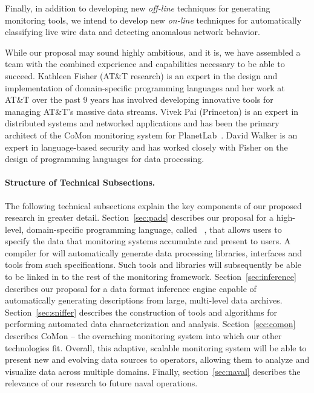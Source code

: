 Finally, in addition to developing new {\em off-line} techniques for
generating monitoring tools, we intend to develop new {\em on-line}
techniques for automatically classifying live wire data and
detecting anomalous network behavior.

While our proposal may sound highly ambitious, and it is, we have
assembled a team with the combined experience and capabilities
necessary to be able to succeed.  Kathleen Fisher (AT\&T research) 
is an expert in the design and implementation of domain-specific
programming languages and her work at AT\&T over the past 9 years
has involved developing innovative tools for managing AT\&T's
massive data streams.  Vivek Pai (Princeton) is an expert in distributed
systems and networked applications
and has been the primary architect of the CoMon monitoring system
for PlanetLab~\cite{planetlab}.  David Walker is an expert in language-based security
and has worked closely with Fisher on the design of programming languages
for data processing. 

\paragraph*{Structure of Technical Subsections.}
The following technical subsections explain the key components of
our proposed research in greater detail.    
Section~\ref{sec:pads} describes our proposal for a high-level, 
domain-specific programming language, called
\pads{}~\cite{fisher+:pads,fisher+:popl06,mandelbaum+:pads-ml}, that
allows users to specify the data that monitoring systems 
accumulate and present to users.  A compiler for \pads{} will
automatically generate data processing libraries, interfaces and tools
from such specifications.  Such tools and libraries will subsequently 
be able to be linked in to the
rest of the monitoring framework.   
Section~\ref{sec:inference} describes our proposal for a 
data format inference engine capable
of automatically generating \pads{} descriptions from
large, multi-level data archives.   Section~\ref{sec:sniffer}
describes the construction of tools and algorithms for 
performing automated data characterization and analysis.
Section~\ref{sec:comon}
describes CoMon -- the overaching monitoring system into which our other 
technologies fit.  Overall, this adaptive, scalable monitoring system will 
be able to present new and evolving data sources to operators, allowing them to
analyze and visualize data across multiple domains.  Finally, 
section~\ref{sec:naval} describes the relevance of our research to future
naval operations.



